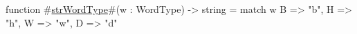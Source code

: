 function #\hyperref[zstrWordType]{strWordType}#(w : WordType) -> string = match w {
  B => "b",
  H => "h",
  W => "w",
  D => "d"
}
